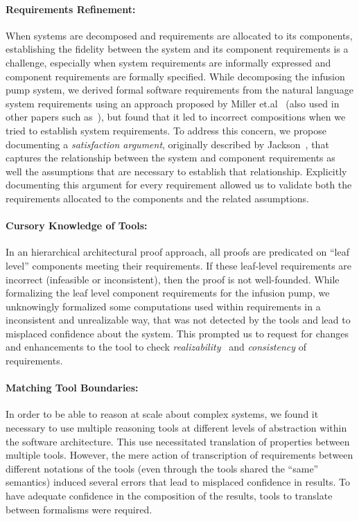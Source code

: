 \paragraph{\textbf{Requirements Refinement:}} When systems are decomposed and requirements are allocated to its components, establishing the fidelity between the system and its component requirements is a challenge, especially when system requirements are informally expressed and component requirements are formally specified. While decomposing the infusion pump system, we derived formal software requirements from the natural language system requirements using an approach proposed by Miller et.al~\cite{Miller01:dasc} (also used in other papers such as~\cite{jeffords2010model,kauppinen2007re, lempia2009requirements}), but found that it led to incorrect compositions when we tried to establish system requirements. %
To address this concern, we propose documenting a \emph{satisfaction argument}, originally described by Jackson~\cite{jackson1995world}, that captures the relationship between the system and component requirements as well the assumptions that are necessary to establish that relationship. Explicitly documenting this argument for every requirement allowed us to validate both the requirements allocated to the components and the related assumptions.
\vspace{-0.15in}
\paragraph{\textbf{Cursory Knowledge of Tools:}} In an hierarchical architectural proof approach, all proofs are predicated on ``leaf level'' components meeting their requirements. If these leaf-level requirements are incorrect (infeasible or inconsistent), then the proof is not well-founded. While formalizing the leaf level component requirements for the infusion pump, we unknowingly formalized some computations used within requirements in a inconsistent and unrealizable way, that was not detected by the tools and lead to misplaced confidence about the system. This prompted us to request for changes and enhancements to the tool to check {\em realizability}~\cite{gacek2015towards} and {\em consistency} of requirements.
\vspace{-0.15in}
\paragraph{\textbf{Matching Tool Boundaries:}} In order to be able to reason at scale about complex systems, we found it necessary to use multiple reasoning tools at different levels of abstraction within the software architecture. This use necessitated translation of properties between multiple tools. However, the mere action of transcription of requirements between different notations of the tools (even through the tools shared the “same” semantics) induced several errors that lead to misplaced confidence in results. To have adequate confidence in the composition of the results, tools to translate between formalisms were required. 

